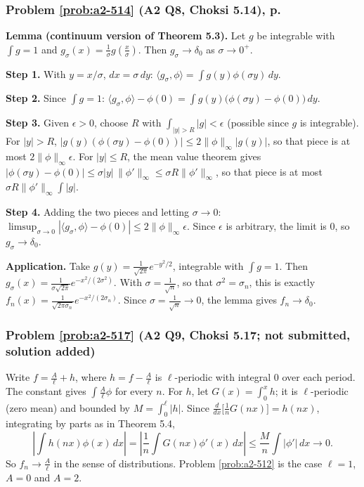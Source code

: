 \documentclass{article}
\newcommand{\ip}[2]{\langle #1, #2 \rangle}
\begin{document}
\subsubsection*{Problem \ref{prob:a2-514} (A2 Q8, Choksi 5.14), p.~\pageref{prob:a2-514}}
\textbf{Lemma (continuum version of Theorem 5.3).} Let $g$ be integrable with $\int g = 1$ and $g_\sigma(x) = \frac1\sigma g(\frac x\sigma)$. Then $g_\sigma \to \delta_0$ as $\sigma \to 0^+$.\par
\textbf{Step 1.} With $y = x/\sigma$, $dx = \sigma\,dy$: $\ip{g_\sigma}{\phi} = \int g(y)\phi(\sigma y)\,dy$.\par
\textbf{Step 2.} Since $\int g = 1$: $\ip{g_\sigma}{\phi} - \phi(0) = \int g(y)\big(\phi(\sigma y) - \phi(0)\big)\,dy$.\par
\textbf{Step 3.} Given $\epsilon > 0$, choose $R$ with $\int_{|y|>R}|g| < \epsilon$ (possible since $g$ is integrable). For $|y| > R$, $|g(y)(\phi(\sigma y) - \phi(0))| \leq 2\|\phi\|_\infty|g(y)|$, so that piece is at most $2\|\phi\|_\infty\epsilon$. For $|y| \leq R$, the mean value theorem gives $|\phi(\sigma y) - \phi(0)| \leq \sigma|y|\,\|\phi'\|_\infty \leq \sigma R\|\phi'\|_\infty$, so that piece is at most $\sigma R\|\phi'\|_\infty\int|g|$.\par
\textbf{Step 4.} Adding the two pieces and letting $\sigma \to 0$: $\limsup_{\sigma\to0}|\ip{g_\sigma}{\phi} - \phi(0)| \leq 2\|\phi\|_\infty\epsilon$. Since $\epsilon$ is arbitrary, the limit is $0$, so $g_\sigma \to \delta_0$.\par
\textbf{Application.} Take $g(y) = \frac{1}{\sqrt{2\pi}}e^{-y^2/2}$, integrable with $\int g = 1$. Then $g_\sigma(x) = \frac{1}{\sigma\sqrt{2\pi}}e^{-x^2/(2\sigma^2)}$. With $\sigma = \frac{1}{\sqrt n}$, so that $\sigma^2 = \sigma_n$, this is exactly $f_n(x) = \frac{1}{\sqrt{2\pi\sigma_n}}e^{-x^2/(2\sigma_n)}$. Since $\sigma = \frac{1}{\sqrt n} \to 0$, the lemma gives $f_n \to \delta_0$.

\label{sol:a2-517}
\subsubsection*{Problem \ref{prob:a2-517} (A2 Q9, Choksi 5.17; not submitted, solution added)}
Write $f = \frac A\ell + h$, where $h = f - \frac A\ell$ is $\ell$-periodic with integral $0$ over each period. The constant gives $\int\frac A\ell\phi$ for every $n$. For $h$, let $G(x) = \int_0^xh$; it is $\ell$-periodic (zero mean) and bounded by $M = \int_0^\ell|h|$. Since $\frac{d}{dx}\big[\frac1nG(nx)\big] = h(nx)$, integrating by parts as in Theorem 5.4,
\begin{equation*}
    \left|\int h(nx)\phi(x)\,dx\right| = \left|\frac1n\int G(nx)\phi'(x)\,dx\right| \leq \frac Mn\int|\phi'|\,dx \to 0.
\end{equation*}
So $f_n \to \frac A\ell$ in the sense of distributions. Problem \ref{prob:a2-512} is the case $\ell = 1$, $A = 0$ and $A = 2$.
\end{document}
